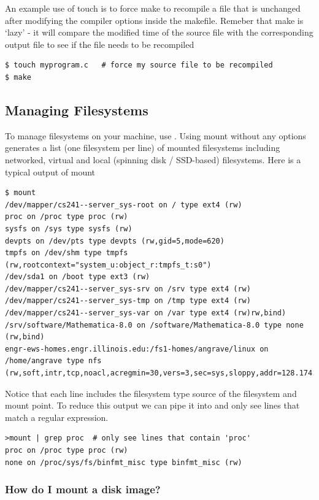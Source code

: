 An example use of touch is to force make to recompile a file that is unchanged after modifying the compiler options inside the makefile. Remeber that make is `lazy' - it will compare the modified time of the source file with the corresponding output file to see if the file needs to be recompiled

\begin{lstlisting}
$ touch myprogram.c   # force my source file to be recompiled
$ make
\end{lstlisting}


\subsection{Managing Filesystems}

To manage filesystems on your machine, use . Using mount without any options generates a list (one filesystem per line) of mounted filesystems including networked, virtual and local (spinning disk / SSD-based) filesystems. Here is a typical output of mount

\begin{lstlisting}
$ mount
/dev/mapper/cs241--server_sys-root on / type ext4 (rw)
proc on /proc type proc (rw)
sysfs on /sys type sysfs (rw)
devpts on /dev/pts type devpts (rw,gid=5,mode=620)
tmpfs on /dev/shm type tmpfs (rw,rootcontext="system_u:object_r:tmpfs_t:s0")
/dev/sda1 on /boot type ext3 (rw)
/dev/mapper/cs241--server_sys-srv on /srv type ext4 (rw)
/dev/mapper/cs241--server_sys-tmp on /tmp type ext4 (rw)
/dev/mapper/cs241--server_sys-var on /var type ext4 (rw)rw,bind)
/srv/software/Mathematica-8.0 on /software/Mathematica-8.0 type none (rw,bind)
engr-ews-homes.engr.illinois.edu:/fs1-homes/angrave/linux on /home/angrave type nfs (rw,soft,intr,tcp,noacl,acregmin=30,vers=3,sec=sys,sloppy,addr=128.174.252.102)
\end{lstlisting}

Notice that each line includes the filesystem type source of the filesystem and mount point. To reduce this output we can pipe it into  and only see lines that match a regular expression.

\begin{lstlisting}
>mount | grep proc  # only see lines that contain 'proc'
proc on /proc type proc (rw)
none on /proc/sys/fs/binfmt_misc type binfmt_misc (rw)
\end{lstlisting}

\subsubsection{How do I mount a disk image?}\label{how-do-i-mount-a-disk-image}

